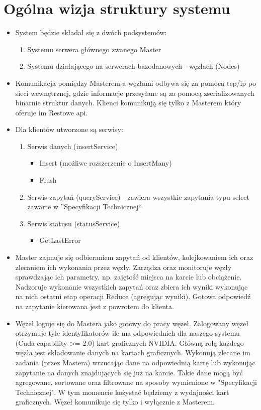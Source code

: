 \documentclass[paper=a4, fontsize=11pt]{scrartcl} %
\numberwithin{equation}{section} %
\numberwithin{figure}{section} %
\numberwithin{table}{section} %
\begin{document}
\section{Ogólna wizja struktury systemu}
\begin{itemize}
	\item System będzie składał się z dwóch podsystemów:
		\begin{enumerate}
			\item Systemu serwera głównego zwanego Master
			\item Systemu działającego na serwerach bazodanowych - węzłach (Nodes)
		\end{enumerate}
	\item Komunikacja pomiędzy Masterem a węzłami odbywa się za pomocą tcp/ip po sieci wewnętrznej, gdzie informacje przesyłane są za pomocą 
		zserializowanych binarnie struktur danych. Klienci komunikują się tylko z Masterem który oferuje im Restowe api. 
	\item Dla klientów utworzone są serwisy:
		\begin{enumerate}
			\item Serwis danych (insertService)
				\begin{itemize}
					\item Insert (możliwe rozszerzenie o InsertMany)
					\item Flush
				\end{itemize}
			\item Serwis zapytań (queryService) - zawiera wszystkie zapytania typu select zawarte w ''Specyfikacji Technicznej``
			\item Serwis statusu (statusService)
				\begin{itemize}
					\item GetLastError
				\end{itemize}
		\end{enumerate}
	\item Master zajmuje się odbieraniem zapytań od klientów, kolejkowaniem ich oraz zlecaniem ich wykonania przez węzły. Zarządza oraz monitoruje 
		węzły sprawdzając ich parametry, np. zajętość miejsca na karcie lub obciążenie. Nadzoruje wykonanie wszystkich zapytań oraz zbiera ich wyniki 
		wykonując na nich ostatni etap operacji Reduce (agregując wyniki). Gotowa odpowiedź na zapytanie kierowana jest z powrotem do klienta.
	\item Węzeł loguje się do Mastera jako gotowy do pracy węzeł. Zalogowany węzeł otrzymuje tyle identyfikatorów ile ma odpowiednich dla naszego systemu 
		(Cuda capability >= 2.0) kart graficznych NVIDIA. Główną rolą każdego węzła jest składowanie danych na kartach graficznych. Wykonują zlecane im 
		zadania (przez Mastera) wrzucając dane na odpowiednią kartę lub wykonując zapytanie na danych znajdujących się już na karcie. Takie dane mogą 
		być agregowane, sortowane oraz filtrowane na sposoby wymienione w "Specyfikacji Technicznej". W tym momencie kożystać będziemy z wydajności 
		kart graficznych. Węzeł komunikuje się tylko i wyłącznie z Masterem.
\end{itemize}
\end{document}
